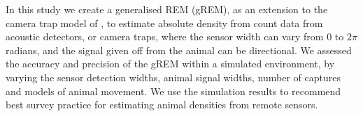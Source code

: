 In this study we create a generalised REM (gREM), as an extension to the camera trap model of \citep{rowcliffe2008estimating}, to estimate absolute density from count data from acoustic detectors, or camera traps, where the sensor width can vary from 0 to $2\pi$ radians, and the signal given off from the animal can be directional. We assessed the accuracy and precision of the gREM within a simulated environment, by varying the sensor detection widths, animal signal widths, number of captures and models of animal movement. We use the simulation results to recommend best survey practice for estimating animal densities from remote sensors. 


